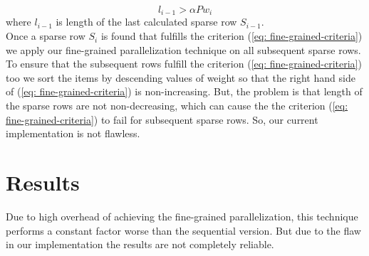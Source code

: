 \begin{equation}
\label{eq: fine-grained-criteria}
l_{i-1} > \alpha P w_i
\end{equation}
where $l_{i-1}$ is length of the last calculated sparse row $S_{i-1}$. \\
Once a sparse row $S_i$ is found that fulfills the criterion (\ref{eq: fine-grained-criteria}) we apply our fine-grained parallelization technique on all subsequent sparse rows. To ensure that the subsequent rows fulfill the criterion (\ref{eq: fine-grained-criteria}) too we sort the items by descending values of weight so that the right hand side of (\ref{eq: fine-grained-criteria}) is non-increasing. But, the problem is that length of the sparse rows are not non-decreasing, which can cause the the criterion (\ref{eq: fine-grained-criteria}) to fail for subsequent sparse rows. So, our current implementation is not flawless.


\section{Results}
Due to high overhead of achieving the fine-grained parallelization, this technique performs a constant factor worse than the sequential version. But due to the flaw in our implementation the results are not completely reliable. 




